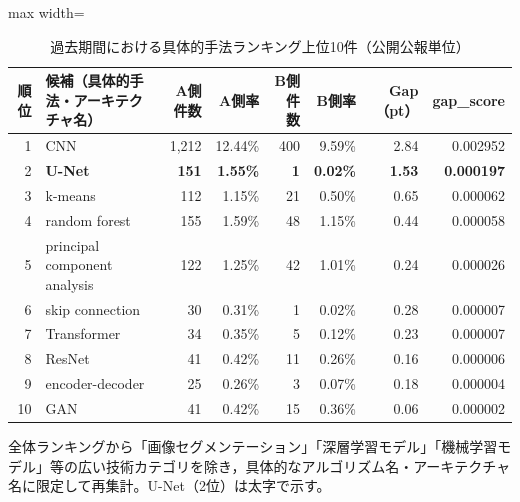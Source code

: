 \begin{table}[tbp]
\centering
\caption{過去期間における具体的手法ランキング上位10件（公開公報単位）}
\label{tab:experiment1_specific_methods_ranking}
\begin{adjustbox}{max width=\textwidth}
\begin{tabular}{rlrrrrrr}
\toprule
順位 & 候補（具体的手法・アーキテクチャ名） & A側件数 & A側率 & B側件数 & B側率 & Gap（pt） & gap\_score \\
\midrule
1  & CNN                             & 1,212 & 12.44\% & 400 &  9.59\% & 2.84 & 0.002952 \\
2  & \textbf{U-Net}                  & \textbf{151} & \textbf{1.55\%} & \textbf{1} & \textbf{0.02\%} & \textbf{1.53} & \textbf{0.000197} \\
3  & k-means                         &   112 &  1.15\% &  21 &  0.50\% & 0.65 & 0.000062 \\
4  & random forest                   &   155 &  1.59\% &  48 &  1.15\% & 0.44 & 0.000058 \\
5  & principal component analysis    &   122 &  1.25\% &  42 &  1.01\% & 0.24 & 0.000026 \\
6  & skip connection                 &    30 &  0.31\% &   1 &  0.02\% & 0.28 & 0.000007 \\
7  & Transformer                     &    34 &  0.35\% &   5 &  0.12\% & 0.23 & 0.000007 \\
8  & ResNet                          &    41 &  0.42\% &  11 &  0.26\% & 0.16 & 0.000006 \\
9  & encoder-decoder                 &    25 &  0.26\% &   3 &  0.07\% & 0.18 & 0.000004 \\
10 & GAN                             &    41 &  0.42\% &  15 &  0.36\% & 0.06 & 0.000002 \\
\bottomrule
\end{tabular}
\end{adjustbox}
\begin{flushleft}
\footnotesize
全体ランキングから「画像セグメンテーション」「深層学習モデル」「機械学習モデル」等の広い技術カテゴリを除き，具体的なアルゴリズム名・アーキテクチャ名に限定して再集計。U-Net（2位）は太字で示す。
\end{flushleft}
\end{table}
